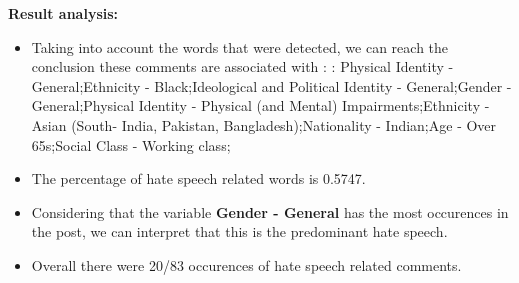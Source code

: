 \documentclass[11pt]{article}
\begin{document}
\textbf{\Large Result analysis:}

\begin{itemize}\item Taking into account the words that were detected, we can reach the conclusion these comments are associated with : : Physical Identity - General;Ethnicity - Black;Ideological and Political Identity - General;Gender - General;Physical Identity - Physical (and Mental) Impairments;Ethnicity - Asian (South- India, Pakistan, Bangladesh);Nationality - Indian;Age - Over 65s;Social Class - Working class;%

\item The percentage of hate speech related words is 0.5747.

\item Considering that the variable \textbf{Gender - General} has the most occurences in the post, we can interpret that this is the predominant hate speech.

\item Overall there were 20/83 occurences of hate speech related comments.\end{itemize}
\end{document}
